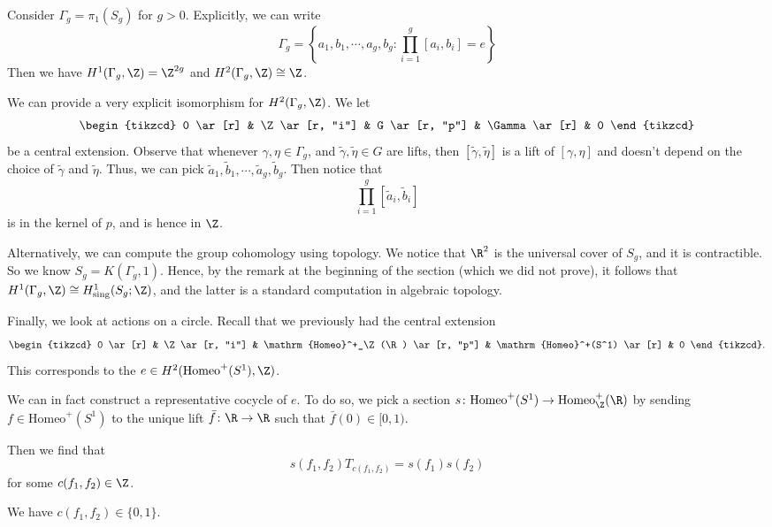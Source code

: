 \documentclass[a4paper]{article}
\newcommand\Homeo{\mathrm{Homeo}}
\begin{document}
\begin{eg}
  Consider $\Gamma_g = \pi_1(S_g)$ for $g > 0$. Explicitly, we can write
  \[
    \Gamma_g = \left\{a_1, b_1, \cdots, a_g, b_g : \prod_{i = 1}^g [a_i, b_i] = e\right\}
  \]
  Then we have $H^1(\Gamma_g, \Z) = \Z^{2g}$ and $H^2(\Gamma_g, \Z) \cong \Z$.

  We can provide a very explicit isomorphism for $H^2(\Gamma_g, \Z)$. We let
  \[
    \begin{tikzcd}
      0 \ar[r] & \Z \ar[r, "i"] & G \ar[r, "p"] & \Gamma \ar[r] & 0
    \end{tikzcd}
  \]
  be a central extension. Observe that whenever $\gamma, \eta \in \Gamma_g$, and $\tilde{\gamma}, \tilde{\eta} \in G$ are lifts, then $[\tilde{\gamma}, \tilde{\eta}]$ is a lift of $[\gamma, \eta]$ and doesn't depend on the choice of $\tilde{\gamma}$ and $\tilde{\eta}$. Thus, we can pick $\tilde{a}_1, \tilde{b}_1, \cdots, \tilde{a}_g, \tilde{b}_g$. Then notice that
  \[
    \prod_{i = 1}^g [\tilde{a}_i, \tilde{b}_i]
  \]
  is in the kernel of $p$, and is hence in $\Z$.

  Alternatively, we can compute the group cohomology using topology. We notice that $\R^2$ is the universal cover of $S_g$, and it is contractible. So we know $S_g = K(\Gamma_g, 1)$. Hence, by the remark at the beginning of the section (which we did not prove), it follows that $H^1(\Gamma_g, \Z) \cong H^1_{\mathrm{sing}}(S_g; \Z)$, and the latter is a standard computation in algebraic topology.
\end{eg}

Finally, we look at actions on a circle. Recall that we previously had the central extension
\[
  \begin{tikzcd}
    0 \ar[r] & \Z \ar[r, "i"] & \Homeo^+_\Z(\R) \ar[r, "p"] & \Homeo^+(S^1) \ar[r] & 0
  \end{tikzcd}.
\]
This corresponds to the  $e \in H^2(\Homeo^+(S^1), \Z)$.

We can in fact construct a representative cocycle of $e$. To do so, we pick a section $s\colon \Homeo^+(S^1) \to \Homeo_\Z^+(\R)$ by sending $f \in \Homeo^+(S^1)$ to the unique lift $\bar{f}\colon \R \to \R$ such that $\bar{f}(0) \in [0, 1)$.

Then we find that
\[
  s(f_1, f_2) T_{c(f_1, f_2)} = s(f_1) s(f_2)
\]
for some $c(f_1, f_2) \in \Z$.

\begin{lemma}
  We have $c(f_1, f_2) \in \{0, 1\}$.
\end{lemma}
\end{document}

